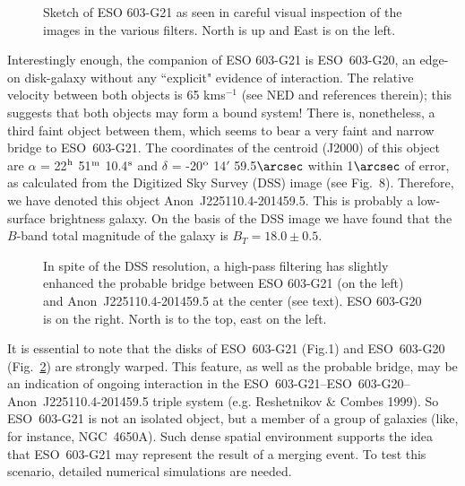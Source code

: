 \documentclass{aa}
\begin{document}
\begin{figure}
\caption[7]{Sketch  of ESO 603-G21 as seen in careful visual inspection
of the images in the various  filters. North
is up and East is on the left.}
\label{draw}
\end{figure}

Interestingly  enough, the companion of ESO 603-G21 is \mbox{ESO  603-G20},
an edge-on  disk-galaxy  without any ``explicit"  evidence of  interaction.
The relative  velocity  between both objects is 65 kms$^{-1}$  (see NED and
references  therein);  this  suggests  that both objects may form a
bound system!  There is, nonetheless, a third
faint  object  between  them,  which  seems to bear a very faint and narrow
bridge to  ESO~603-G21.  The  coordinates  of the centroid  (J2000) of this
object are $\alpha$ = 22$^{\rm h}$ 51$^{\rm m}$ 10.4$^{\rm s}$ and $\delta$
=  -20$^{\rm  o}$  14$'$  59.5$\arcsec$  within  1$\arcsec$  of  error,  as
calculated  from  the  Digitized  Sky  Survey  (DSS)  image  (see  Fig.~8).
Therefore,   we  have   denoted   this   object   
Anon~J225110.4-201459.5.  This
is probably a low-surface brightness galaxy.  On the basis of the DSS image
we  have  found  that  the  $B$-band  total  magnitude  of  the  galaxy  is
$B_T=18.0\pm0.5$.

\begin{figure}

\caption[8]{In  spite of the DSS  resolution,  a  high-pass  filtering  has
slightly enhanced the probable bridge between ESO 603-G21 (on the left) and
Anon~J225110.4-201459.5  at the center (see text).  ESO 603-G20 is on
the right. North is to the top, east on the left.}

\label{dss}
\end{figure}


It is essential to note that the disks of  \mbox{ESO  603-G21}  (Fig.1) and
\mbox{ESO 603-G20}  (Fig.~\ref{dss}) are strongly warped.  This feature, as
well as the probable bridge, may be an indication of ongoing interaction in
the \mbox{ESO  603-G21}--\mbox{ESO   603-G20}--Anon~J225110.4-201459.5   triple
system (e.g.  Reshetnikov \& Combes 1999).  So \mbox{ESO 603-G21} is not an
isolated  object, but a member of a group of galaxies  (like, for instance,
NGC~4650A).  Such dense spatial  environment  supports the 
idea that  \mbox{ESO  603-G21}  may  represent  the  result of  a
merging event.  To test this scenario, detailed  numerical  simulations are
needed.
\end{document}
